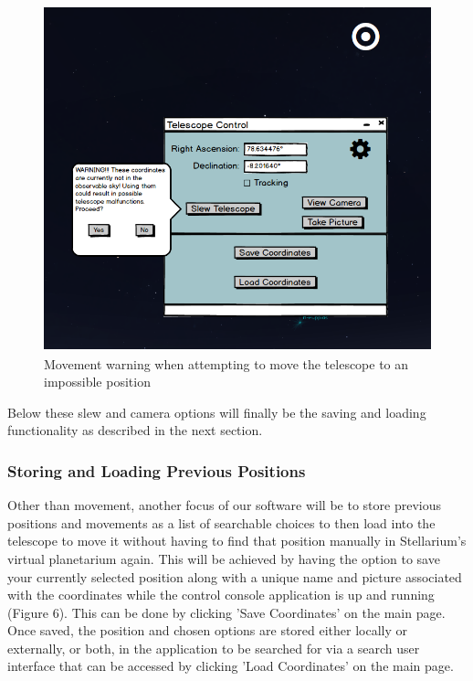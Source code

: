 \documentclass[12pt]{report}
\begin{document}
\newpage

\begin{figure}[h]
	\centering
	\includegraphics[width=0.80\linewidth, height=10cm]{MainScreenSlewWarning}
	\caption{Movement warning when attempting to move the telescope to an impossible position}
\end{figure}

Below these slew and camera options will finally be the saving and loading functionality as described in the next section.



\subsubsection*{Storing and Loading Previous Positions}

Other than movement, another focus of our software will be to store previous positions and movements as a list of searchable choices to then load into the telescope to move it without having to find that position manually in Stellarium's virtual planetarium again. This will be achieved by having the option to save your currently selected position along with a unique name and picture associated with the coordinates while the control console application is up and running (Figure 6). This can be done by clicking 'Save Coordinates' on the main page. Once saved, the position and chosen options are stored either locally or externally, or both, in the application to be searched for via a search user interface that can be accessed by clicking 'Load Coordinates' on the main page.

\newpage
\end{document}

